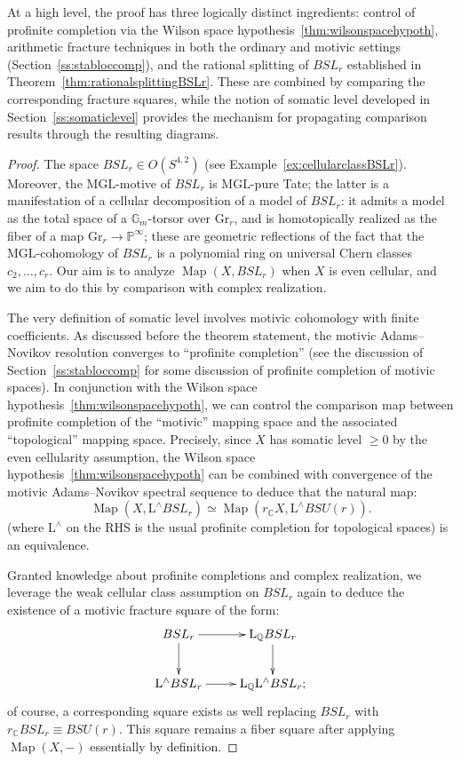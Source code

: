 \documentclass[11pt,leqno]{article}
\newcommand{\Map}{\operatorname{Map}}
\newcommand{\cplx}{{\mathbb C}}
\newcommand{\Q}{{\mathbb Q}}
\renewcommand{\1}{{\rm 1\hspace*{-0.4ex}%
\rule{0.1ex}{1.52ex}\hspace*{0.2ex}}}
\newcommand{\gm}[1]{{{\mathbb G}_{m}^{#1}}}
\renewcommand{\L}{{\mathrm L}}
\newcommand{\<}[1]{{\langle}#1 {\rangle}}
\theoremstyle{plain}
\theoremstyle{definition}
\theoremstyle{remark}
\numberwithin{equation}{subsection}
\begin{document}
At a high level, the proof has three logically distinct ingredients: control of profinite completion via the Wilson space hypothesis~\ref{thm:wilsonspacehypoth}, arithmetic fracture techniques in both the ordinary and motivic settings (Section~\ref{ss:stabloccomp}), and the rational splitting of \(BSL_r\) established in Theorem~\ref{thm:rationalsplittingBSLr}. These are combined by comparing the corresponding fracture squares, while the notion of somatic level developed in Section~\ref{ss:somaticlevel} provides the mechanism for propagating comparison results through the resulting diagrams.

\begin{proof}
	The space $BSL_r \in O(S^{4,2})$ (see Example~\ref{ex:cellularclassBSLr}).  Moreover, the $\mathrm{MGL}$-motive of $BSL_r$ is $\mathrm{MGL}$-pure Tate; the latter is a manifestation of a cellular decomposition of a model of $BSL_r$: it admits a model as the total space of a $\gm{}$-torsor over $\mathrm{Gr}_r$, and is homotopically realized as the fiber of a map $\mathrm{Gr}_r \to {\mathbb P}^{\infty}$; these are geometric reflections of the fact that the $\mathrm{MGL}$-cohomology of $BSL_r$ is a polynomial ring on universal Chern classes $c_2,\ldots,c_r$.  Our aim is to analyze $\Map(X,BSL_r)$ when $X$ is even cellular, and we aim to do this by comparison with complex realization.  
	
	The very definition of somatic level involves motivic cohomology with finite coefficients.  As discussed before the theorem statement, the motivic Adams--Novikov resolution converges to ``profinite completion'' (see the discussion of Section~\ref{ss:stabloccomp} for some discussion of profinite completion of motivic spaces).  In conjunction with the Wilson space hypothesis~\ref{thm:wilsonspacehypoth}, we can control the comparison map between profinite completion of the ``motivic'' mapping space and the associated ``topological'' mapping space.  Precisely, since $X$ has somatic level $\geq 0$ by the even cellularity assumption, the Wilson space hypothesis~\ref{thm:wilsonspacehypoth} can be combined with convergence of the motivic Adams--Novikov spectral sequence to deduce that the natural map:
	\[
	\Map(X,\L^{\wedge} BSL_r) \simeq \Map(r_{\cplx} X, \L^{\wedge}BSU(r)).
	\]
	(where $\L^{\wedge}$ on the RHS is the usual profinite completion for topological spaces) is an equivalence.   
	
	Granted knowledge about profinite completions and complex realization, we leverage the weak cellular class assumption on $BSL_r$ again to deduce the existence of a motivic fracture square of the form:
	\[
	\xymatrix{
	BSL_r \ar[r]\ar[d] & \L_{\Q} BSL_r \ar[d] \\
	\L^{\wedge} BSL_r \ar[r] & \L_{\Q} \L^{\wedge} BSL_r;
	}
	\]
	of course, a corresponding square exists as well replacing $BSL_r$ with $r_{\cplx} BSL_r \equiv BSU(r)$.  This square remains a fiber square after applying $\Map(X,-)$ essentially by definition.  
 	

\end{proof}
\end{document}
